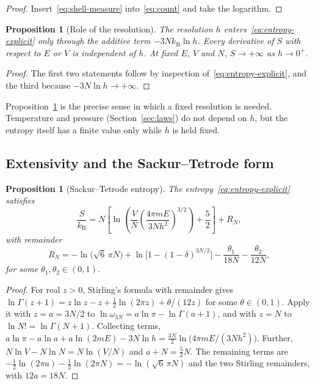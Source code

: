 \documentclass[11pt,a4paper]{article}
\newtheorem{proposition}[theorem]{Proposition}
\theoremstyle{definition}
\theoremstyle{remark}
\newcommand{\kB}{k_{\mathrm{B}}}
\begin{document}
\begin{proof}
Insert~\eqref{eq:shell-measure} into~\eqref{eq:count} and take the logarithm.
\end{proof}

\begin{proposition}[Role of the resolution]
\label{prop:hdep}
The resolution $h$ enters~\eqref{eq:entropy-explicit} only through the additive term $-3N\kB\ln h$.
Every derivative of $S$ with respect to $E$ or $V$ is independent of $h$.
At fixed $E$, $V$ and $N$, $S\to+\infty$ as $h\to0^{+}$.
\end{proposition}

\begin{proof}
The first two statements follow by inspection of~\eqref{eq:entropy-explicit}, and the third because $-3N\ln h\to+\infty$.
\end{proof}

Proposition~\ref{prop:hdep} is the precise sense in which a fixed resolution is needed.
Temperature and pressure (Section~\ref{sec:laws}) do not depend on $h$, but the entropy itself has a finite value only while $h$ is held fixed.

\subsection{Extensivity and the Sackur--Tetrode form}

\begin{proposition}[Sackur--Tetrode entropy]
\label{prop:sackur}
The entropy~\eqref{eq:entropy-explicit} satisfies
\begin{equation}
\frac{S}{\kB}=N\left[\ln\!\left(\frac VN\left(\frac{4\pi mE}{3Nh^{2}}\right)^{3/2}\right)+\frac52\right]+R_N,
\label{eq:sackur}
\end{equation}
with remainder
\begin{equation}
R_N=-\ln\bigl(\sqrt6\,\pi N\bigr)+\ln\bigl[1-(1-\delta)^{3N/2}\bigr]-\frac{\theta_1}{18N}-\frac{\theta_2}{12N},
\label{eq:remainder}
\end{equation}
for some $\theta_1,\theta_2\in(0,1)$.
\end{proposition}

\begin{proof}
For real $z>0$, Stirling's formula with remainder gives $\ln\Gamma(z+1)=z\ln z-z+\tfrac12\ln(2\pi z)+\theta/(12z)$ for some $\theta\in(0,1)$.
Apply it with $z=a=3N/2$ to $\ln\omega_{3N}=a\ln\pi-\ln\Gamma(a+1)$, and with $z=N$ to $\ln N!=\ln\Gamma(N+1)$.
Collecting terms, $a\ln\pi-a\ln a+a\ln(2mE)-3N\ln h=\tfrac{3N}{2}\ln\bigl(4\pi mE/(3Nh^{2})\bigr)$.
Further, $N\ln V-N\ln N=N\ln(V/N)$ and $a+N=\tfrac52N$.
The remaining terms are $-\tfrac12\ln(2\pi a)-\tfrac12\ln(2\pi N)=-\ln(\sqrt6\,\pi N)$ and the two Stirling remainders, with $12a=18N$.
\end{proof}
\end{document}
